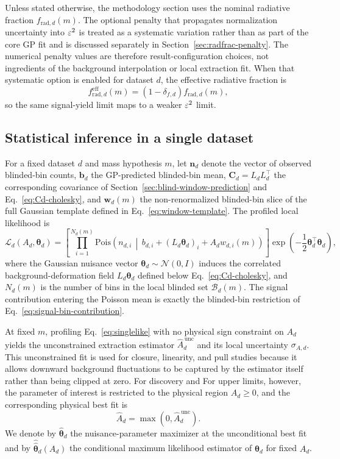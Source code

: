 Unless stated otherwise, the methodology section uses the nominal radiative fraction
$f_{\mathrm{rad},d}(m)$. The optional penalty that propagates normalization uncertainty
into $\varepsilon^2$ is treated as a systematic variation rather than as part of the core GP
fit and is discussed separately in Section~\ref{sec:radfrac-penalty}. The numerical
penalty values are therefore result-configuration choices, not ingredients of the
background interpolation or local extraction fit. When that systematic option is
enabled for dataset $d$, the effective radiative fraction is
\begin{equation}
f_{\mathrm{rad},d}^{\mathrm{eff}}(m)
= \left(1-\delta_{f,d}\right) f_{\mathrm{rad},d}(m),
\end{equation}
so the same signal-yield limit maps to a weaker $\varepsilon^2$ limit.

\subsection{Statistical inference in a single dataset}

For a fixed dataset $d$ and mass hypothesis $m$, let $\bm{n}_d$ denote the vector of
observed blinded-bin counts, $\bm{b}_d$ the GP-predicted blinded-bin mean,
$\bm{C}_d=L_dL_d^\top$ the corresponding covariance of
Section~\ref{sec:blind-window-prediction} and Eq.~\eqref{eq:Cd-cholesky}, and
$\bm{w}_d(m)$ the
non-renormalized blinded-bin slice of the full Gaussian template defined in
Eq.~\eqref{eq:window-template}. The profiled local likelihood is
\begin{equation}
\mathcal{L}_d(A_d,\bm{\theta}_d)
=
\left[
\prod_{i=1}^{N_d(m)}
\mathrm{Pois}\!\left(
n_{d,i}\,\middle|\,
b_{d,i} + (L_d\bm{\theta}_d)_i + A_d w_{d,i}(m)
\right)
\right]
\exp\!\left(-\frac{1}{2}\bm{\theta}_d^\top\bm{\theta}_d\right),
\label{eq:singlelike}
\end{equation}
where the Gaussian nuisance vector $\bm{\theta}_d\sim\mathcal{N}(0,I)$ induces the
correlated background-deformation field $L_d\bm{\theta}_d$ defined below
Eq.~\eqref{eq:Cd-cholesky}, and $N_d(m)$ is the number of bins in the local blinded
set $\mathcal{B}_d(m)$. The signal contribution entering the Poisson mean is exactly
the blinded-bin restriction of Eq.~\eqref{eq:signal-bin-contribution}.

At fixed $m$, profiling Eq.~\eqref{eq:singlelike} with no physical sign constraint on
$A_d$ yields the unconstrained extraction estimator $\hat A_d^{\,\mathrm{unc}}$ and
its local uncertainty $\sigma_{A,d}$. This unconstrained fit is used for closure,
linearity, and pull studies because it allows downward background fluctuations to be
captured by the estimator itself rather than being clipped at zero. For discovery and
For upper limits, however, the parameter of interest is restricted to the
physical region $A_d\ge0$, and the corresponding physical best fit is
\begin{equation}
\hat A_d = \max\!\left(0,\hat A_d^{\,\mathrm{unc}}\right).
\end{equation}
We denote by $\hat{\bm{\theta}}_d$ the nuisance-parameter maximizer at the
unconditional best fit and by $\hat{\hat{\bm{\theta}}}_d(A_d)$ the conditional maximum
likelihood estimator of $\bm{\theta}_d$ for fixed $A_d$.

